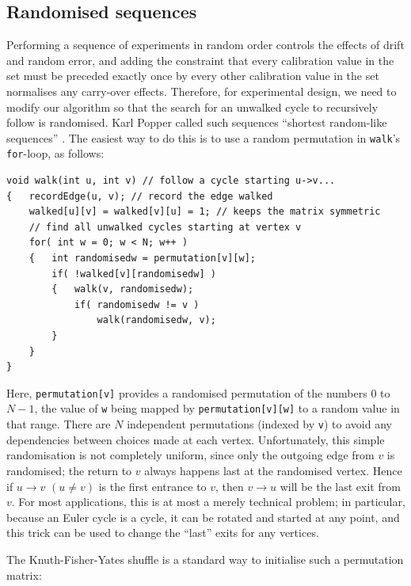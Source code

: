 \documentclass[12pt]{article}
\begin{document}
\subsection{Randomised sequences}\label{randomise}

Performing a sequence of experiments in random order controls the effects of drift and random error, and adding the constraint that every calibration value in the set must be preceded exactly once by every other calibration value in the set normalises any carry-over effects. Therefore, for experimental design, we need to modify our algorithm so that the search for an unwalked cycle to recursively follow is randomised. Karl Popper called such sequences ``shortest random-like sequences'' \cite{popper}. The easiest way to do this is to use a random permutation in \texttt{walk}'s \texttt{for}-loop, as follows:

\begin{verbatim}
void walk(int u, int v) // follow a cycle starting u->v...
{   recordEdge(u, v); // record the edge walked
    walked[u][v] = walked[v][u] = 1; // keeps the matrix symmetric
    // find all unwalked cycles starting at vertex v
    for( int w = 0; w < N; w++ )
    {   int randomisedw = permutation[v][w];
        if( !walked[v][randomisedw] )
        {   walk(v, randomisedw);
            if( randomisedw != v )
                walk(randomisedw, v);
        }
    }
}
\end{verbatim}

Here, \texttt{permutation[v]} provides a randomised permutation of the numbers $0$ to $N-1$, the value of \texttt{w} being mapped by \texttt{permutation[v][w]} to a random value in that range. 
There are $N$ independent permutations (indexed by \texttt{v}) to avoid any dependencies between choices made at each vertex.  Unfortunately, this simple randomisation is not completely uniform, since only the outgoing edge from $v$ is randomised; the return to $v$ always happens last at the randomised vertex. Hence if $u\rightarrow v$ $(u \neq v)$ is the first entrance to $v$, then $v \rightarrow u$ will be the last exit from $v$. For most applications, this is at most a merely technical problem; in particular, because an Euler cycle is a cycle, it can be rotated and started at any point, and this trick can be used to change the ``last'' exits for any vertices.

The Knuth-Fisher-Yates shuffle \cite[p145--146]{knuth2} is a standard way to initialise such a permutation matrix:
\end{document}
